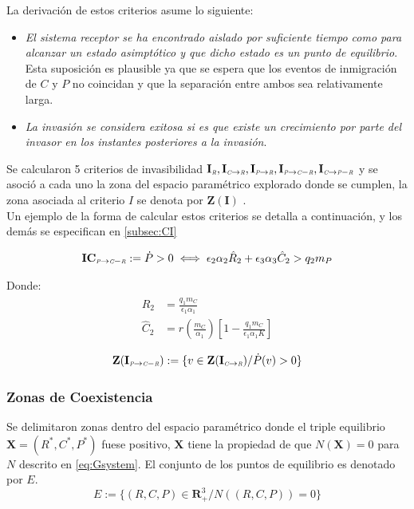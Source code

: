 La derivaci\'on de estos criterios asume lo siguiente:
\begin{itemize}
\item \emph{El sistema receptor se ha encontrado aislado por suficiente tiempo como para alcanzar un estado asimpt\'otico y que dicho estado es un punto de equilibrio}.\\Esta suposici\'on es plausible ya que se espera que los eventos de inmigraci\'on de $C$ y $P$ no coincidan y que la separaci\'on entre ambos sea relativamente larga.
\item \emph{La invasi\'on se considera exitosa si es que existe un crecimiento por parte del invasor en los instantes posteriores a la invasi\'on}.
\end{itemize}

Se calcularon 5 criterios de invasibilidad $\mathbf{I_{\textit{\tiny R}},I_{\textit{\tiny C} \to \textit{\tiny R}},I_{\textit{\tiny P} \to \textit{\tiny R}},I_{\textit{\tiny P} \to \textit{\tiny C}-\textit{\tiny R}},I_{\textit{\tiny C} \to \textit{\tiny P}-\textit{\tiny R}}}$ y se asoci\'o a cada uno la zona del espacio param\'etrico explorado donde se cumplen, la zona asociada al criterio $I$ se denota por $\mathbf{Z(I)}$ .\\

Un ejemplo de la forma de calcular estos criterios se detalla a continuaci\'on, y los dem\'as se especifican en \ref{subsec:CI}


\begin{equation} \mathbf{IC_{\textit{\tiny P} \to \textit{\tiny C}-\textit{\tiny R}}} := \dot{P} >0 \iff \epsilon_2\alpha_2\hat{R}_2 + \epsilon_3\alpha_3\hat{C}_2 > q_2 m_P \end{equation}

Donde:
\begin{equation}
\begin{aligned}
\hat{R}_2 &= \frac{q_1 m_C}{\epsilon_1 \alpha_1} \\
\hat{C}_2 &=  r(\frac{m_C}{\alpha_1}) \left[ 1 - \frac{q_1 m_C}{\epsilon_1 \alpha_1 K} \right] 
\end{aligned}
\end{equation}

\begin{equation}
\mathbf{Z(I_{\textit{\tiny P} \to \textit{\tiny C}-\textit{\tiny R}})} := \{ v \in \mathbf{Z(I_{\textit{\tiny C} \to \textit{\tiny R}})} / \dot{P}(v) > 0 \}
\end{equation}


\subsubsection{Zonas de Coexistencia}
Se delimitaron zonas dentro del espacio param\'etrico donde el triple equilibrio $\mathbf{X} = (R^*,C^*,P^*)$ fuese positivo, $\mathbf{X}$ tiene la propiedad de que $N(\mathbf{X}) = 0$ para $N$ descrito en \eqref{eq:Gsystem}. El conjunto de los puntos de equilibrio es denotado por $E$.
\begin{equation}\label{eq:Equilibrio}
E:= \{ (R,C,P) \in \mathbf{R}^3_+ / N((R,C,P)) = 0 \}
\end{equation}

